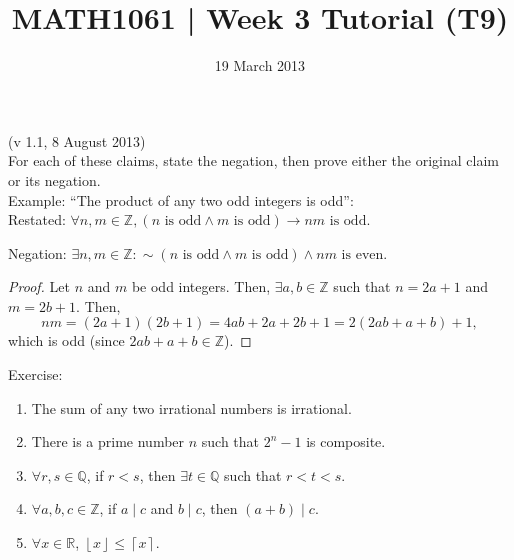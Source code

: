 \documentclass[a4paper,12pt]{article}
\newcommand{\floor}[1]{\left\lfloor #1 \right\rfloor}
\newcommand{\ceil}[1]{\left\lceil #1 \right\rceil}
\begin{document}
\pagestyle{myheadings}

\title{MATH1061 | Week 3 Tutorial (T9)}
\date{19 March 2013}
\maketitle

(v 1.1, 8 August 2013)
\\

\noindent
For each of these claims, state the negation, then prove either the original claim or its negation.
\\

\noindent
Example: ``The product of any two odd integers is odd'':
\\

\noindent
Restated: $\forall n, m \in \mathbb{Z}, (n \text{ is odd} \land m \text{ is odd})
\rightarrow nm \text{ is odd}$.

\noindent
Negation: $\exists n, m \in \mathbb{Z}: \sim (n \text{ is odd} \land m \text{ is odd})
\land nm \text{ is even}$.

\begin{proof}
Let $n$ and $m$ be odd integers. Then, $\exists a, b \in \mathbb{Z}$ such
that $n = 2a+1$ and $m = 2b+1$. Then,
\[
    nm = (2a+1)(2b+1) = 4ab + 2a + 2b + 1 = 2(2ab + a + b) + 1,
\]
which is odd (since $2ab + a + b \in \mathbb{Z}$).
\end{proof}

Exercise:

\begin{enumerate}
\item The sum of any two irrational numbers is irrational.
\item There is a prime number $n$ such that $2^n - 1$ is composite.
\item $\forall r, s \in \mathbb{Q}$, if $r < s$, then $\exists t \in \mathbb{Q}$ such that $r < t < s$.
\item $\forall a, b, c \in \mathbb{Z}$, if $a \mid c$ and $b \mid c$, then $(a + b) \mid c$.
\item $\forall x \in \mathbb{R}$, $\floor{x} \leq \ceil{x}$.
\end{enumerate}
\end{document}
